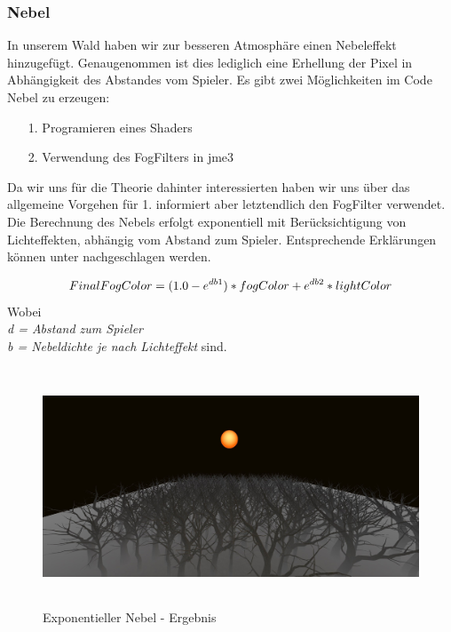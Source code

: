 \subsubsection{Nebel}
In unserem Wald haben wir zur besseren Atmosphäre einen Nebeleffekt hinzugefügt. Genaugenommen ist dies lediglich eine Erhellung der Pixel in Abhängigkeit des Abstandes vom Spieler. Es gibt zwei Möglichkeiten im Code Nebel zu erzeugen:
\begin{enumerate}
	\item[1.] Programieren eines Shaders 
	\item[2.] Verwendung des FogFilters in jme3
\end{enumerate}
Da wir uns für die Theorie dahinter interessierten haben wir uns über das allgemeine Vorgehen für 1. informiert aber letztendlich den FogFilter verwendet.
Die Berechnung des Nebels erfolgt exponentiell mit Berücksichtigung von Lichteffekten, abhängig vom Abstand zum Spieler. Entsprechende Erklärungen können unter \cite{Cr14} nachgeschlagen werden.

\begin{equation}
	FinalFogColor = (1.0-e^{db\textrm{1}})*fogColor + e^{db\textrm{2}} * lightColor \\
\end{equation} Wobei \\ \emph{
	d = Abstand zum Spieler} \\
	\emph{b = Nebeldichte je nach Lichteffekt} sind.


\begin{figure}[h!]
	\myfloatalign
	\caption{Exponentieller Nebel - Ergebnis}
	
	\includegraphics[width=.9\linewidth, height = 200pt]{images/fog} 
	
\end{figure}


